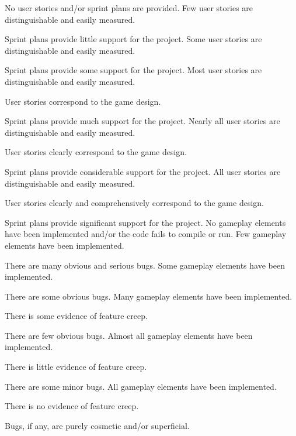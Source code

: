 \documentclass{../../fal_assignment}
\begin{document}
\begin{markingrubric}
%
        \grade\fail No user stories and/or sprint plans are provided.
        \grade Few user stories are distinguishable and easily measured.
            \par Sprint plans provide little support for the project.
        \grade Some user stories are distinguishable and easily measured.
            \par Sprint plans provide some support for the project.
        \grade Most user stories are distinguishable and easily measured.
            \par User stories correspond to the game design.
            \par Sprint plans provide much support for the project.
        \grade Nearly all user stories are distinguishable and easily measured.
            \par User stories clearly correspond to the game design.
            \par Sprint plans provide considerable support for the project.
        \grade All user stories are distinguishable and easily measured.
            \par User stories clearly and comprehensively correspond to the game design.
            \par Sprint plans provide significant support for the project.
%
        \grade\fail No gameplay elements have been implemented and/or the code fails to compile or run.
        \grade Few gameplay elements have been implemented.
            \par There are many obvious and serious bugs.
        \grade Some gameplay elements have been implemented.
            \par There are some obvious bugs.
        \grade Many gameplay elements have been implemented.
            \par There is some evidence of feature creep.
            \par There are few obvious bugs.
        \grade Almost all gameplay elements have been implemented.
            \par There is little evidence of feature creep.
            \par There are some minor bugs.
        \grade All gameplay elements have been implemented.
            \par There is no evidence of feature creep.
            \par Bugs, if any, are purely cosmetic and/or superficial.

\end{markingrubric}
\end{document}
